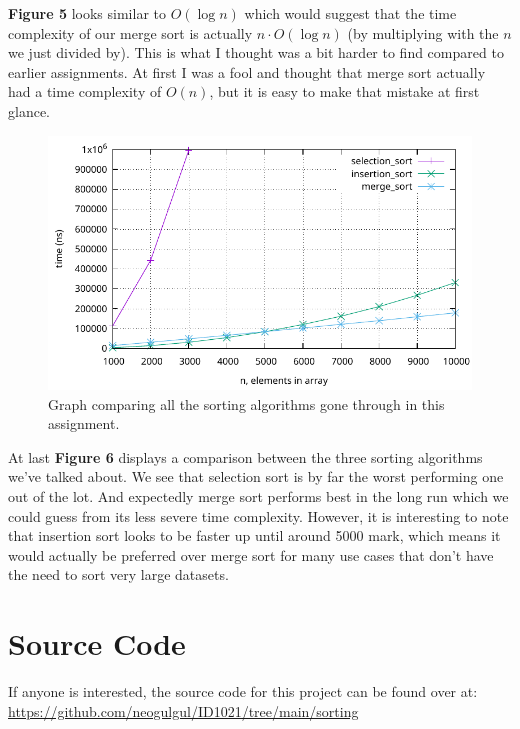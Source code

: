 \documentclass[a4paper, 11pt]{article}
\begin{document}
	\textbf{Figure 5} looks similar to \(O(\log n)\) which would suggest that the time complexity of our merge sort is actually \(n \cdot O(\log n)\)
	(by multiplying with the \(n\) we just divided by).
	This is what I thought was a bit harder to find compared to earlier assignments.
	At first I was a fool and thought that merge sort actually had a time complexity of \(O(n)\), but it is easy to make that mistake at first glance.
	\begin{figure}[H]
		\centering
		\includegraphics[scale=0.7]{graphs/selection_sort_vs_insertion_sort_vs_merge_sort.pdf}
		\caption{
			Graph comparing all the sorting algorithms gone through in this assignment.
		}
	\end{figure}
	At last \textbf{Figure 6} displays a comparison between the three sorting algorithms we've talked about.
	We see that selection sort is by far the worst performing one out of the lot.
	And expectedly merge sort performs best in the long run which we could guess from its less severe time complexity.
	However, it is interesting to note that insertion sort looks to be faster up until around 5000 mark,
	which means it would actually be preferred over merge sort for many use cases that don't have the need to sort very large datasets.

\section{Source Code}
	If anyone is interested, the source code for this project can be found over at:
	\url{https://github.com/neogulgul/ID1021/tree/main/sorting}
\end{document}

